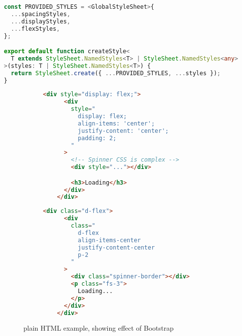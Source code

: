 \documentclass{l4proj}
\begin{document}
\begin{lstlisting}[language=typescript, caption={custom style function in \href{https://github.com/ineshbose/portion-mate/blob/c51ee3f32d05df641157467169e9659732202b7b/src/app/constants/Styles/index.ts\#L28}{\code{./src/app/constants/Styles/index.ts}}}]
const PROVIDED_STYLES = <GlobalStyleSheet>{
  ...spacingStyles,
  ...displayStyles,
  ...flexStyles,
};

export default function createStyle<
  T extends StyleSheet.NamedStyles<T> | StyleSheet.NamedStyles<any>
>(styles: T | StyleSheet.NamedStyles<T>) {
  return StyleSheet.create({ ...PROVIDED_STYLES, ...styles });
}
\end{lstlisting}

\begin{figure}
    \centering
    \noindent\begin{subfigure}{.49\textwidth}
    \begin{lstlisting}[language=html, caption={using inline styles}]
    <div style="display: flex;">
      <div
        style="
          display: flex;
          align-items: 'center';
          justify-content: 'center';
          padding: 2;
        "
      >
        <!-- Spinner CSS is complex -->
        <div style="..."></div>

        <h3>Loading</h3>
      </div>
    </div>
    \end{lstlisting}
    \end{subfigure}\hfill
    \begin{subfigure}{.49\textwidth}

    \begin{lstlisting}[language=html, caption={using Bootstrap classes}]
    <div class="d-flex">
      <div
        class="
          d-flex
          align-items-center
          justify-content-center
          p-2
        "
      >
        <div class="spinner-border"></div>
        <p class="fs-3">
          Loading...
        </p>
      </div>
    </div>
    \end{lstlisting}
    \end{subfigure}
    \caption{plain HTML example, showing effect of Bootstrap}
\end{figure}
\end{document}

